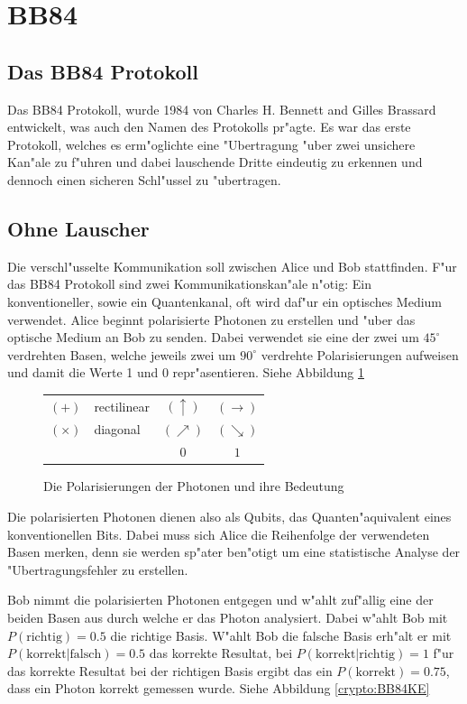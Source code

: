 \section{BB84}
  \subsection{Das BB84 Protokoll}
  Das BB84 Protokoll, wurde 1984 von Charles H. Bennett and Gilles Brassard entwickelt,
  was auch den Namen des Protokolls pr"agte.
  Es war das erste Protokoll, welches es erm"oglichte eine "Ubertragung "uber zwei unsichere Kan"ale zu f"uhren
  und dabei lauschende Dritte eindeutig zu erkennen und dennoch einen sicheren Schl"ussel zu "ubertragen.

  \subsection{Ohne Lauscher}
  Die verschl"usselte Kommunikation soll zwischen Alice und Bob stattfinden.
  F"ur das BB84 Protokoll sind zwei Kommunikationskan"ale n"otig:
  Ein konventioneller, sowie ein Quantenkanal, oft wird daf"ur ein optisches Medium verwendet.
  Alice beginnt polarisierte Photonen zu erstellen und "uber das optische Medium an Bob zu senden.
  Dabei verwendet sie eine der zwei um $45^{\circ}$ verdrehten Basen,
  welche jeweils zwei um $90^{\circ}$ verdrehte Polarisierungen aufweisen und damit die Werte 1 und 0 repr"asentieren. Siehe Abbildung \ref{crypto:poltab}

  \begin{figure}
    \centering
    \begin{tabular}{l l || c c}
      \hline
      $(+)$ & rectilinear & $(\uparrow)$ & $(\rightarrow)$\\
      $(\times)$ & diagonal & $(\nearrow)$ & $(\searrow)$\\
      \hline
      & & $0$ & $1$\\
      \hline
    \end{tabular}
    \caption{Die Polarisierungen der Photonen und ihre Bedeutung\label{crypto:poltab}}
  \end{figure}

  Die polarisierten Photonen dienen also als Qubits, das Quanten"aquivalent eines konventionellen Bits.
  Dabei muss sich Alice die Reihenfolge der verwendeten Basen merken,
  denn sie werden sp"ater ben"otigt um eine statistische Analyse der "Ubertragungsfehler zu erstellen.

  Bob nimmt die polarisierten Photonen entgegen und w"ahlt zuf"allig eine der beiden Basen aus durch welche er das Photon analysiert.
  Dabei w"ahlt Bob mit
  $P(\text{richtig})=0.5$
  die richtige Basis.
  W"ahlt Bob die falsche Basis erh"alt er mit
  $P(\text{korrekt}|\text{falsch})=0.5$
  das korrekte Resultat, bei
  $P(\text{korrekt}|\text{richtig})=1$
  f"ur das korrekte Resultat bei der richtigen Basis ergibt das ein
  $P(\text{korrekt})=0.75$,
  dass ein Photon korrekt gemessen wurde.
  Siehe Abbildung \ref{crypto:BB84KE}

